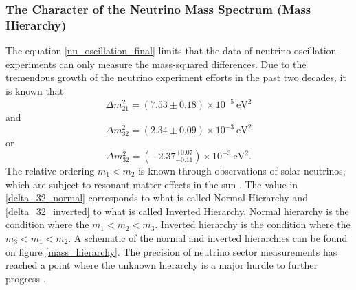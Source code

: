 \subsubsection{The Character of the Neutrino Mass Spectrum (Mass Hierarchy)}

The equation \ref{nu_oscillation_final} limits that the data of neutrino oscillation experiments can only measure the mass-squared differences. Due to the tremendous growth of the neutrino experiment efforts in the past two decades, it is known that \cite{delta_2_1}
%
\begin{equation}
	\Delta m^2_{21} = (7.53 \pm 0.18) \times 10^{-5} \ \text{eV}^2
	\label{delta_21}
\end{equation}
%
and \cite{delta_3_2}
%
\begin{equation}
	\Delta m^2_{32} = (2.34 \pm 0.09) \times 10^{-3} \ \text{eV}^2
	\label{delta_32_normal}
\end{equation}
%
or 
%
\begin{equation}
	\Delta m^2_{32} = (-2.37^{+0.07}_{-0.11}) \times 10^{-3} \ \text{eV}^2.
	\label{delta_32_inverted}
\end{equation}
%
The relative ordering $m_1 < m_2$ is known through observations of solar neutrinos, which are subject to resonant matter effects in the sun \cite{delta_2_1}. The value in \ref{delta_32_normal} corresponds to what is called Normal Hierarchy and \ref{delta_32_inverted} to what is called Inverted Hierarchy. Normal hierarchy is the condition where the $m_1 < m_2 < m_3$. Inverted hierarchy is the condition where the $m_3 < m_1 < m_2$. A schematic of the normal and inverted hierarchies can be found on figure \ref{mass_hierarchy}. The precision of neutrino sector measurements has reached a point where the unknown hierarchy is a major hurdle to further progress \cite{prospects_patterson}.

